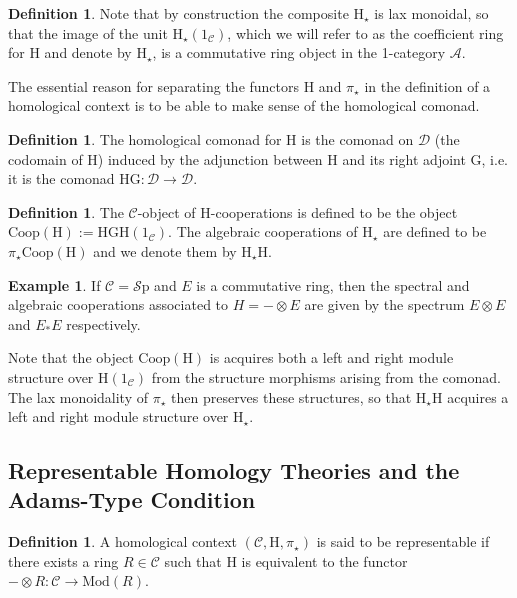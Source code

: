 \documentclass[10pt]{amsart}
\theoremstyle{definition}
\numberwithin{figure}{section}
\numberwithin{equation}{section}
\newtheorem{definition}[figure]{Definition}
\newtheorem{example}[figure]{Example}
\newcommand{\cA}{\mathcal{A}}
\newcommand{\cC}{\mathcal{C}}
\newcommand{\cD}{\mathcal{D}}
\newcommand{\one}{\mathrm{1}}
\theoremstyle{cited}
\newcommand{\Sp}{{\mathcal{S}\mathrm{p}}}
\newcommand{\Mod}{\mathrm{Mod}}
\renewcommand{\H}{\mathrm{H}}
\newcommand{\G}{\mathrm{G}}
\newcommand{\Coop}{\mathrm{Coop}}
\begin{document}
\begin{definition}
  Note that by construction the composite $\H_\star$ is lax monoidal, so that the image of the unit $\H_\star(\one_{\cC})$, which we will refer to as the coefficient ring for $\H$ and denote by $\H_\star$, is a commutative ring object in the 1-category $\cA$.
\end{definition}

The essential reason for separating the functors $\H$ and $\pi_\star$ in the definition of a homological context is to be able to make sense of the homological comonad.

\begin{definition}
  The homological comonad for $\H$ is the comonad on $\cD$ (the codomain of $\H$) induced by the adjunction between $\H$ and its right adjoint $\G$, i.e. it is the comonad $\H\G: \cD\to \cD$. 
\end{definition}

\begin{definition}
  The $\cC$-object of $\H$-cooperations is defined to be the object $\Coop(\H):=\H\G\H(\one_{\cC})$. The algebraic cooperations of $\H_\star$ are defined to be $\pi_\star\Coop(\H)$ and we denote them by $\H_\star \H$.
\end{definition}

\begin{example}
  If $\cC=\Sp$ and $E$ is a commutative ring, then the spectral and algebraic cooperations associated to $H=-\otimes E$ are given by the spectrum $E\otimes E$ and $E_*E$ respectively.
\end{example}

Note that the object $\Coop(\H)$ is acquires both a left and right module structure over $\H(\one_{\cC})$ from the structure morphisms arising from the comonad. The lax monoidality of $\pi_\star$ then preserves these structures, so that $\H_\star \H$ acquires a left and right module structure over $\H_\star$.

\subsection{Representable Homology Theories and the Adams-Type Condition}

\begin{definition}
    A homological context $(\cC,\H,\pi_\star)$ is said to be representable if there exists a ring $R\in \cC$ such that $\H$ is equivalent to the functor $-\otimes R: \cC\to \Mod(R)$.
\end{definition}
\end{document}
